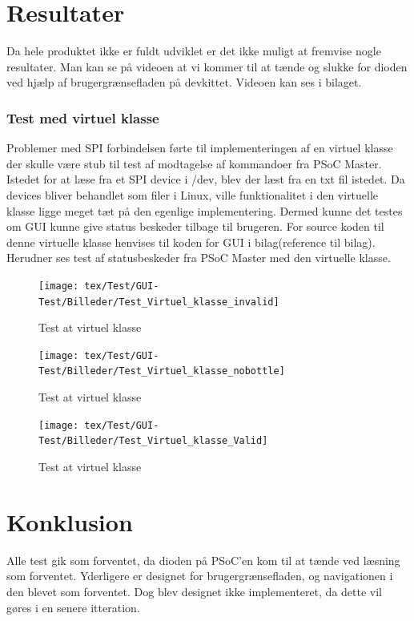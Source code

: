 \section*{Resultater}

Da hele produktet ikke er fuldt udviklet er det ikke muligt at fremvise nogle resultater. Man kan se på videoen at vi kommer til at tænde og slukke for dioden ved hjælp af brugergrænsefladen på devkittet. Videoen kan ses i bilaget.

\subsubsection{Test med virtuel klasse}
Problemer med SPI forbindelsen førte til implementeringen af en virtuel klasse der skulle være stub til test af modtagelse af kommandoer fra PSoC Master.
Istedet for at læse fra et SPI device i /dev, blev der læst fra en txt fil istedet. Da devices bliver behandlet som filer i Linux, ville funktionalitet i den 
virtuelle klasse ligge meget tæt på den egenlige implementering. Dermed kunne det testes om GUI kunne give status beskeder tilbage til brugeren. For 
source koden til denne virtuelle klasse henvises til koden for GUI i bilag(reference til bilag).
Herudner ses test af statusbeskeder fra PSoC Master med den virtuelle klasse.

\begin{figure}[H]
	\texttt{[image: tex/Test/GUI-Test/Billeder/Test\_Virtuel\_klasse\_invalid]}
	\caption{Test at virtuel klasse}
\end{figure}

\begin{figure}[H]
	\texttt{[image: tex/Test/GUI-Test/Billeder/Test\_Virtuel\_klasse\_nobottle]}
	\caption{Test at virtuel klasse}
\end{figure}

\begin{figure}[H]
	\texttt{[image: tex/Test/GUI-Test/Billeder/Test\_Virtuel\_klasse\_Valid]}
	\caption{Test at virtuel klasse}
\end{figure}

\section{Konklusion}

Alle test gik som forventet, da dioden på PSoC'en kom til at tænde ved læsning som forventet. Yderligere er designet for brugergrænsefladen, og navigationen i den blevet som forventet. Dog blev designet ikke implementeret, da dette vil gøres i en senere itteration.